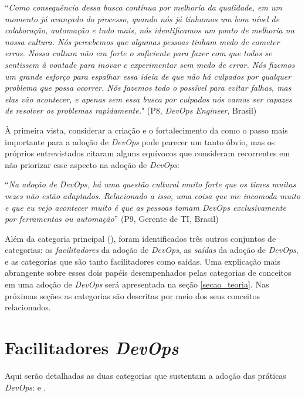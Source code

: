 \begin{mq}
``\emph{Como consequência dessa busca contínua por melhoria da qualidade, em um
momento já avançado do processo, quando nós já tínhamos um bom nível de
colaboração, automação e tudo mais, nós identificamos um ponto de melhoria na
nossa cultura. Nós percebemos que algumas pessoas tinham medo de cometer erros.
Nossa cultura não era forte o suficiente para fazer com que todos se sentissem
à vontade para inovar e experimentar sem medo de errar. Nós fizemos um grande
esforço para espalhar essa ideia de que não há culpados por qualquer problema
que possa ocorrer. Nós fazemos todo o possível para evitar falhas, mas elas
vão acontecer, e apenas sem essa busca por culpados nós vamos ser capazes de
resolver os problemas rapidamente.}" (P8, {\it DevOps Engineer}, Brasil)
\end{mq}

À primeira vista, considerar a criação e o fortalecimento da \cc como o passo
mais importante para a adoção de {\it DevOps} pode parecer um tanto óbvio, mas
os próprios entrevistados citaram alguns equívocos que consideram recorrentes
em não priorizar esse aspecto na adoção de {\it DevOps}:

\begin{mq}``\emph{Na adoção de {\it DevOps}, há uma questão cultural muito forte
que os times muitas vezes não estão adaptados. Relacionado a isso, uma coisa
que me incomoda muito e que eu vejo acontecer muito é que as pessoas tomam
{\it DevOps} exclusivamente por ferramentas ou automação}'' (P9, Gerente de
\acrshort{TI}, Brasil)
\end{mq}

Além da categoria principal (\cc), foram identificados três outros conjuntos de
categorias: os \emph{facilitadores} da adoção de {\it DevOps}, as \emph{saídas}
da adoção de {\it DevOps}, e as categorias que são tanto facilitadores como
saídas. Uma explicação mais abrangente sobre esses dois papéis desempenhados
pelas categorias de conceitos em uma adoção de {\it DevOps} será apresentada
na seção \ref{secao_teoria}. Nas próximas seções as categorias são descritas
por meio dos seus conceitos relacionados.

\section{Facilitadores \emph{DevOps}}\label{secao_facilitadores}

Aqui serão detalhadas as duas categorias que sustentam a adoção das práticas
{\it DevOps}:  e .

